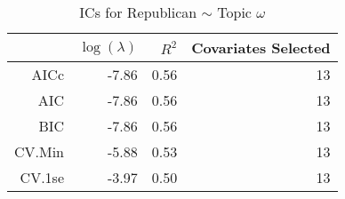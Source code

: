 \begin{table}[ht]
\centering
\begin{tabular}{rrrr}
  \hline
 & $\log(\lambda)$ & $R^2$ & Covariates Selected \\ 
  \hline
AICc & -7.86 & 0.56 &  13 \\ 
  AIC & -7.86 & 0.56 &  13 \\ 
  BIC & -7.86 & 0.56 &  13 \\ 
  CV.Min & -5.88 & 0.53 &  13 \\ 
  CV.1se & -3.97 & 0.50 &  13 \\ 
   \hline
\end{tabular}
\caption{ICs for Republican $\sim$ Topic $\omega$} 
\label{tab:topic_rep}
\end{table}
